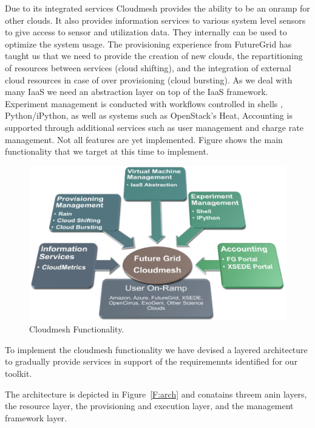 \documentclass{tex/sig-alternate-2013}
\begin{document}
Due to its integrated services Cloudmesh provides the ability to be an onramp for other clouds. It also provides information services to various system level sensors to give access to sensor and utilization data. They internally can be used to optimize the system usage. The provisioning experience from FutureGrid has taught us that we need to provide the creation of new clouds, the repartitioning of resources between services (cloud shifting), and the integration of external cloud resources in case of over provisioning (cloud bursting). As we deal with many IaaS we need an abstraction layer on top of the IaaS framework. Experiment management is conducted with workflows controlled in shells \cite{cmd3}, Python/iPython, as well as systems such as OpenStack's Heat, Accounting is supported through additional services such as user management and charge rate management. Not all features are yet implemented. Figure \label{F:cm-func} shows the main functionality that we target at this time to implement.


\begin{figure}[htb]
  \centering
    \includegraphics[width=1.0\columnwidth]{images/cm-functionality.pdf}
  \caption{Cloudmesh Functionality.}\label{F:cm-func}
\end{figure}

To implement the cloudmesh functionality we have devised a layered
architecture to gradually provide services in support of the
requiremennts identified for our toolkit. 

The architecture is depicted in Figure~\ref{F:arch} and conatains
threem anin layers, the resource layer, the provisioning and execution
layer, and the management framework layer.

\end{document}
